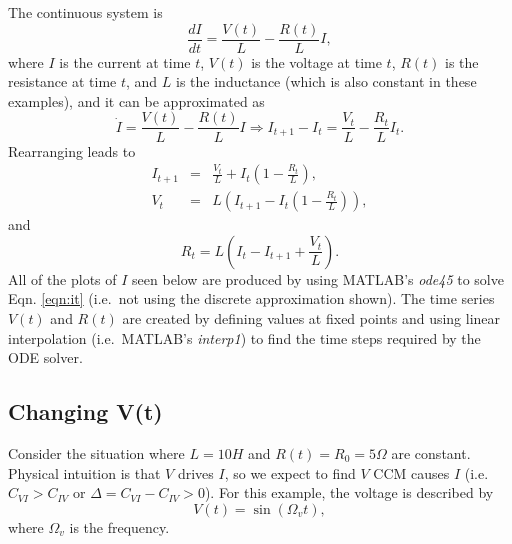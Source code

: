\documentclass[twocolumn,aps,pre,groupedaddress]{revtex4-1}
\begin{document}
The continuous system is
\begin{equation}
\label{eqn:it}
\frac{dI}{dt} = \frac{V(t)}{L} - \frac{R(t)}{L} I,
\end{equation}
where $I$ is the current at time $t$, $V(t)$ is the voltage at time $t$, $R(t)$ is the resistance at time $t$, and $L$ is the inductance (which is also constant in these examples), and it can be approximated as
\begin{equation}
\dot{I} = \frac{V(t)}{L} - \frac{R(t)}{L} I\Rightarrow I_{t+1}-I_t = \frac{V_t}{L} - \frac{R_t}{L} I_t.
\end{equation}
Rearranging leads to
\begin{eqnarray}
I_{t+1} &=& \frac{V_t}{L}+I_t\left(1-\frac{R_t}{L}\right),\\
V_t &=& L\left(I_{t+1}-I_t\left(1-\frac{R_t}{L}\right)\right),
\end{eqnarray}
and
\begin{equation}
R_t = L\left(I_t-I_{t+1}+\frac{V_t}{L}\right).
\end{equation}
All of the plots of $I$ seen below are produced by using MATLAB's {\em ode45} to solve Eqn. \ref{eqn:it} (i.e.\ not using the discrete approximation shown).  The time series $V(t)$ and $R(t)$ are created by defining values at fixed points and using linear interpolation (i.e.\ MATLAB's {\em interp1}) to find the time steps required by the ODE solver.  

\subsection{Changing V(t)}
Consider the situation where $L=10 H$ and $R(t)=R_0=5\Omega$ are constant.  Physical intuition is that $V$ drives $I$, so we expect to find $V$ CCM causes $I$ (i.e.\ $C_{VI}>C_{IV}$ or $\Delta = C_{VI}-C_{IV} > 0$).  For this example, the voltage is described by 
\begin{equation}
\label{eqn:vt}
V(t) = \sin\left(\Omega_v t\right),
\end{equation}
where $\Omega_v$ is the frequency.
\end{document}
